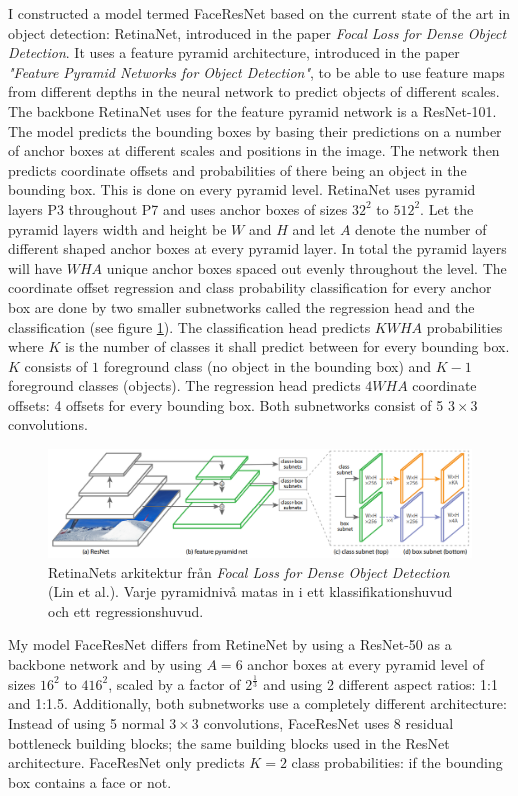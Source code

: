 \documentclass[a4paper,11pt,twoside]{article}
\begin{document}
I constructed a model termed FaceResNet based on the current state of the art in object detection: RetinaNet, introduced in the paper \textit{Focal Loss for Dense Object Detection}. It uses a feature pyramid architecture, introduced in the paper \textit{"Feature Pyramid Networks for Object Detection"}, to be able to use feature maps from different depths in the neural network to predict objects of different scales. The backbone RetinaNet uses for the feature pyramid network is a ResNet-101. The model predicts the bounding boxes by basing their predictions on a number of anchor boxes at different scales and positions in the image. The network then predicts coordinate offsets and probabilities of there being an object in the bounding box. This is done on every pyramid level. RetinaNet uses pyramid layers P3 throughout P7 and uses anchor boxes of sizes $32^2$ to $512^2$. Let the pyramid layers width and height be $W$ and $H$ and let $A$ denote the number of different shaped anchor boxes at every pyramid layer. In total the pyramid layers will have $WHA$ unique anchor boxes spaced out evenly throughout the level. The coordinate offset regression and class probability classification for every anchor box are done by two smaller subnetworks called the regression head and the classification (see figure \ref{figretinanet}). The classification head predicts $KWHA$ probabilities where $K$ is the number of classes it shall predict between for every bounding box. $K$ consists of $1$ foreground class (no object in the bounding box) and $K-1$ foreground classes (objects). The regression head predicts $4WHA$ coordinate offsets: 4 offsets for every bounding box. Both subnetworks consist of 5 $3 \times 3$ convolutions.

\begin{figure}[h]
	\centering
  		\includegraphics[scale=0.38]{retinanet.png}
  	\caption{RetinaNets arkitektur från \textit{Focal Loss for Dense Object Detection} (Lin et al.). Varje pyramidnivå matas in i ett klassifikationshuvud och ett regressionshuvud. \cite{retinanet}}\label{figretinanet}
\end{figure}

My model FaceResNet differs from RetineNet by using a ResNet-50 as a backbone network and by using $A=6$ anchor boxes at every pyramid level of sizes $16^2$ to $416^2$, scaled by a factor of $2^\frac{1}{3}$ and using 2 different aspect ratios: 1:1 and 1:1.5. Additionally, both subnetworks use a completely different architecture: Instead of using 5 normal $3 \times 3$ convolutions, FaceResNet uses 8 residual bottleneck building blocks; the same building blocks used in the ResNet architecture. FaceResNet only predicts $K=2$ class probabilities: if the bounding box contains a face or not.
\end{document}
